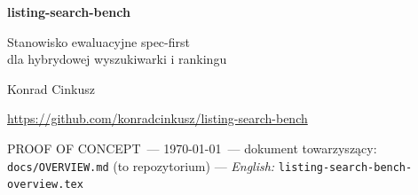 \documentclass[11pt,a4paper]{article}
\newcommand{\paperstatus}{PROOF OF CONCEPT}
\begin{document}
\begin{center}
    {\LARGE\bfseries\sffamily\color{darkblue}
    listing-search-bench}

    \vspace{0.3cm}

    {\Large\sffamily\color{darkgray}
    Stanowisko ewaluacyjne spec-first\\
    dla hybrydowej wyszukiwarki i rankingu}

    \vspace{0.6cm}

    {\large Konrad Cinkusz}

    \vspace{0.2cm}

    {\normalsize\color{darkgray} \url{https://github.com/konradcinkusz/listing-search-bench}}

    \vspace{0.2cm}

    {\normalsize\color{accentred}\sffamily \paperstatus\ --- \today\ ---
     dokument towarzyszący: \texttt{docs/OVERVIEW.md} (to repozytorium) ---
     \textit{English: } \texttt{listing-search-bench-overview.tex}}
\end{center}

\vspace{0.4cm}
\end{document}
